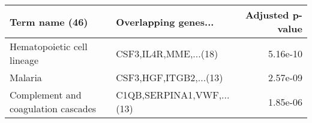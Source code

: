 \begin{tabular}{llr}
\toprule
                     Term name (46) &      Overlapping genes... &  Adjusted p-value \\
\midrule
         Hematopoietic cell lineage &     CSF3,IL4R,MME,...(18) &          5.16e-10 \\
                            Malaria &    CSF3,HGF,ITGB2,...(13) &          2.57e-09 \\
Complement and coagulation cascades & C1QB,SERPINA1,VWF,...(13) &          1.85e-06 \\
\bottomrule
\end{tabular}
